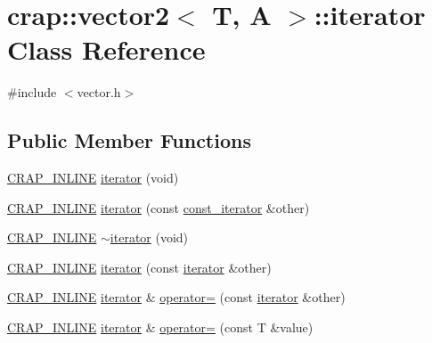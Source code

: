 \hypertarget{classcrap_1_1vector2_1_1iterator}{\section{crap\+:\+:vector2$<$ T, A $>$\+:\+:iterator Class Reference}
\label{classcrap_1_1vector2_1_1iterator}
}


{\ttfamily \#include $<$vector.\+h$>$}

\subsection*{Public Member Functions}
\begin{DoxyCompactItemize}
\item 
\hyperlink{config__x86_8h_a5a40526b8d842e7ff731509998bb0f1c}{C\+R\+A\+P\+\_\+\+I\+N\+L\+I\+N\+E} \hyperlink{classcrap_1_1vector2_1_1iterator_a9ecd03a3bc53d3271458af70874887f3}{iterator} (void)
\item 
\hyperlink{config__x86_8h_a5a40526b8d842e7ff731509998bb0f1c}{C\+R\+A\+P\+\_\+\+I\+N\+L\+I\+N\+E} \hyperlink{classcrap_1_1vector2_1_1iterator_a64a61b518eb172f990a481c09bbd15b1}{iterator} (const \hyperlink{classcrap_1_1vector2_1_1const__iterator}{const\+\_\+iterator} \&other)
\item 
\hyperlink{config__x86_8h_a5a40526b8d842e7ff731509998bb0f1c}{C\+R\+A\+P\+\_\+\+I\+N\+L\+I\+N\+E} \hyperlink{classcrap_1_1vector2_1_1iterator_a172f14fdec67dc20ae3aad90ef58fc9e}{$\sim$iterator} (void)
\item 
\hyperlink{config__x86_8h_a5a40526b8d842e7ff731509998bb0f1c}{C\+R\+A\+P\+\_\+\+I\+N\+L\+I\+N\+E} \hyperlink{classcrap_1_1vector2_1_1iterator_ae01d71d120e2857e7729fd2a1b06fddd}{iterator} (const \hyperlink{classcrap_1_1vector2_1_1iterator}{iterator} \&other)
\item 
\hyperlink{config__x86_8h_a5a40526b8d842e7ff731509998bb0f1c}{C\+R\+A\+P\+\_\+\+I\+N\+L\+I\+N\+E} \hyperlink{classcrap_1_1vector2_1_1iterator}{iterator} \& \hyperlink{classcrap_1_1vector2_1_1iterator_a6bd1115430f8c1cd9eef9e32ad7ead64}{operator=} (const \hyperlink{classcrap_1_1vector2_1_1iterator}{iterator} \&other)
\item 
\hyperlink{config__x86_8h_a5a40526b8d842e7ff731509998bb0f1c}{C\+R\+A\+P\+\_\+\+I\+N\+L\+I\+N\+E} \hyperlink{classcrap_1_1vector2_1_1iterator}{iterator} \& \hyperlink{classcrap_1_1vector2_1_1iterator_a2c5911eccc31c08c46f7cd98ff5aaa74}{operator=} (const T \&value)
\item 

\end{DoxyCompactItemize}

